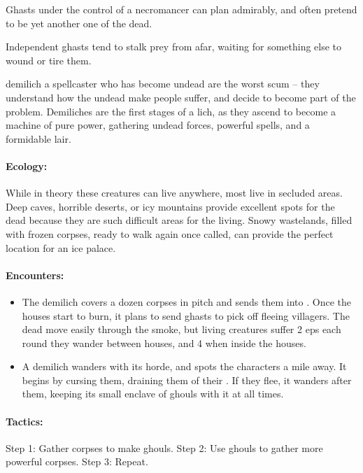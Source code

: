 \begin{multicols}{2}
\begin{itemize}
\end{itemize}


Ghasts under the control of a necromancer can plan admirably, and often pretend to be yet another one of the dead.

Independent ghasts tend to stalk prey from afar, waiting for something else to wound or tire them.

  {demilich}%
  {a spellcaster who has become undead}%
are the worst scum -- they understand how the undead make people suffer, and decide to become part of the problem.
Demiliches are the first stages of a lich, as they ascend to become a machine of pure power, gathering undead forces, powerful spells, and a formidable lair.

\paragraph{Ecology:} While in theory these creatures can live anywhere, most live in secluded areas.
Deep caves, horrible deserts, or icy mountains provide excellent spots for the dead because they are such difficult areas for the living.
Snowy wastelands, filled with frozen corpses, ready to walk again once called, can provide the perfect location for an ice palace.

\paragraph{Encounters:}

\begin{itemize}
  \item
  The demilich covers a dozen corpses in pitch and sends them into .
  Once the houses start to burn, it plans to send ghasts to pick off fleeing villagers.
  The dead move easily through the smoke, but living creatures suffer 2 \glspl{ep} each round they wander between houses, and 4 when inside the houses.
  \item
  A demilich wanders with its horde, and spots the characters a mile away.
  It begins by cursing them, draining them of their .
  If they flee, it wanders after them, keeping its small enclave of ghouls with it at all times.

\end{itemize}

\paragraph{Tactics:}
Step 1: Gather corpses to make ghouls.
Step 2: Use ghouls to gather more powerful corpses.
Step 3: Repeat.


\end{multicols}
